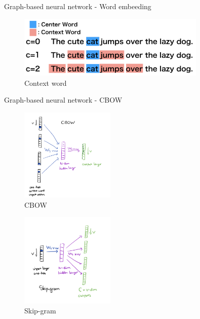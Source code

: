 \begin{frame}{Graph-based neural network - Word embeeding}
    \begin{figure}[htp]
        \centering
        \includegraphics[width=0.8\textwidth]{images/v1survey/context-word.png}
        \caption{Context word}
    \end{figure}
\end{frame}

\begin{frame}{Graph-based neural network - CBOW}
    \begin{multicols*}{2}
        \begin{figure}[htp]
            \centering
            \includegraphics[width=0.4\textwidth]{images/v1survey/cbow.png}
            \caption{CBOW}
        \end{figure}

        \begin{figure}[htp]
            \centering
            \includegraphics[width=0.4\textwidth]{images/v1survey/skip-gram.png}
            \caption{Skip-gram}
        \end{figure}
    \end{multicols*}
\end{frame}

